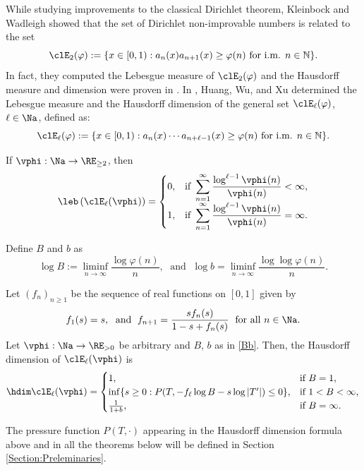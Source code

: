 \documentclass[12pt,a4paper]{amsart}
\begin{document}
While studying improvements to the classical Dirichlet theorem, Kleinbock and Wadleigh \cite{KleinbockWadleigh2019} showed that the set of Dirichlet non-improvable numbers is related to the set
\[
\clE_{2}(\varphi)
:= \{x \in [0,1):a_n(x)a_{n+1}(x) \geq \varphi(n) \text{ for i.m.   } n\in \mathbb{N}\}.
\]
In fact, they computed the Lebesgue measure of $\clE_{2}(\varphi)$ and the Hausdorff measure and dimension were proven in \cite{BHS, HKWW}. In \cite{HuangWuXu2020}, Huang, Wu, and Xu determined the Lebesgue measure and the Hausdorff dimension of the general set $\clE_{\ell}(\varphi)$, $\ell\in\Na$, defined as:
\[
\clE_{\ell}(\varphi)
:= \{x \in [0,1):a_n(x)\cdots a_{n+\ell-1}(x) \geq \varphi(n) \text{ for i.m.   } n\in \mathbb{N}\}.
\]
\begin{teo01}\label{TEO:HWX:MEAS}
If $\vphi:\Na\to \RE_{\geq 2}$, then
\[
\leb\left( \clE_{\ell}(\vphi)\right)
=
\begin{cases}
0, &\text{\rm if } \displaystyle\sum_{n=1}^{\infty} \frac{\log^{\ell-1}\vphi(n)}{\vphi(n)}<\infty, \\    
1, &\text{\rm if } \displaystyle\sum_{n=1}^{\infty} \frac{\log^{\ell-1}\vphi(n)}{\vphi(n)}=\infty.
\end{cases}
\]
\end{teo01}

Define $B$ and $b$ as
\begin{equation}\label{Bb}
\log B := \liminf_{n \xrightarrow{} \infty} \frac{\log \varphi(n)}{n}, 
\;\text{ and }\;
\log b = \liminf_{n \xrightarrow{} \infty} \frac{\log \log \varphi(n)}{n}.
\end{equation}
\begin{teo01}\label{TEO:HWX:HD}
Let $(f_n)_{n\geq 1}$ be the sequence of real functions on $[0,1]$ given by
\[
f_1(s)=s, 
\;\text{ and }\;
f_{n+1}=\frac{sf_n(s)}{1-s+f_n(s)} \;\text{ for all } n\in\Na.
\]
Let $\vphi:\Na\to\RE_{>0}$ be arbitrary and $B$, $b$ as in \eqref{Bb}. Then, the Hausdorff dimension of $\clE_{\ell}(\vphi)$ is 
\[
\hdim \clE_{\ell}(\vphi)
=
\begin{cases}
1, & \text{\rm if } B=1, \\
\inf\{s \geq 0: P(T,-f_{\ell}\log B - s \log |T'|) \leq 0\},  & \text{\rm if }  1<B<\infty,\\
\frac{1}{1+b},  & \text{\rm if }  B=\infty.
\end{cases}
\]
\end{teo01}
The pressure function $P(T,\cdot)$ appearing in the Hausdorff dimension formula above and in all the theorems below will be defined in Section \ref{Section:Preleminaries}.
\end{document}
